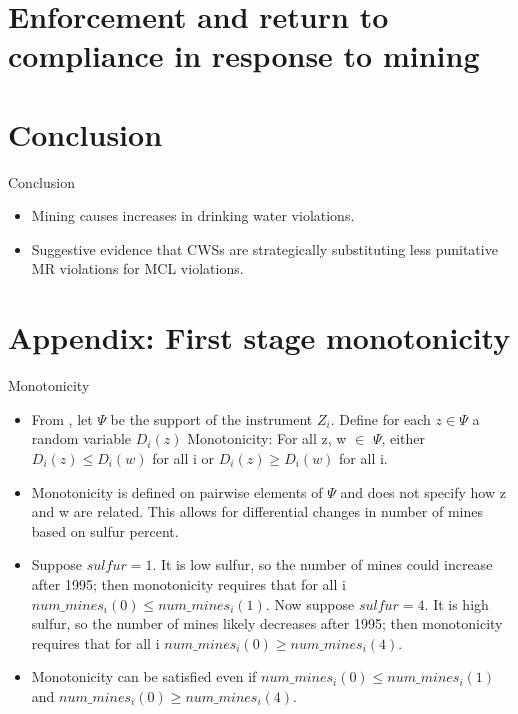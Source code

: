 \documentclass{beamer}
\begin{document}
\section{Enforcement and return to compliance in response to mining}

\begin{frame}

\end{frame}

\begin{frame}

\end{frame}

\section{Conclusion}

\begin{frame}{Conclusion}
    \begin{itemize}
        \item Mining causes increases in drinking water violations.
        \item Suggestive evidence that CWSs are strategically substituting less punitative MR violations for MCL violations.
    \end{itemize}
\end{frame}

\section{Appendix: First stage monotonicity}

\begin{frame}{Monotonicity}
    \begin{itemize}
    \item From \cite{angrist1994identification}, let $\Psi$ be the support of the instrument $Z_i$. Define for each $z \in \Psi$ a random variable $D_i(z)$
    Monotonicity: For all z, w $\in$ $\Psi$, either $D_i(z) \leq D_i(w)$ for all i or $D_i(z) \geq D_i(w)$ for all i. 
    \item Monotonicity is defined on pairwise elements of $\Psi$ and does not specify how z and w are related. This allows for differential changes in number of mines based on sulfur percent. 
    \item Suppose $sulfur= 1$. It is low sulfur, so the number of mines could increase after 1995; then monotonicity requires that for all i $num\_mines_i(0) \leq num\_mines_i(1)$. Now suppose $sulfur = 4$. It is high sulfur, so the number of mines likely decreases after 1995; then monotonicity requires that for all i $num\_mines_i(0) \geq num\_mines_i(4)$. 
    \item Monotonicity can be satisfied even if $num\_mines_i(0) \leq num\_mines_i(1)$ and $num\_mines_i(0) \geq num\_mines_i(4)$.
\end{itemize}
\end{frame}
\end{document}
